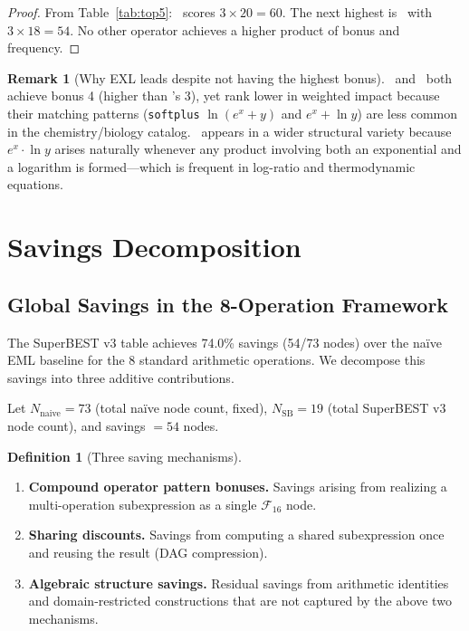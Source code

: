 \documentclass[12pt,a4paper]{article}
\theoremstyle{definition}
\newtheorem{definition}[theorem]{Definition}
\newtheorem{remark}[theorem]{Remark}
\newcommand{\EML}{\operatorname{EML}}
\newcommand{\EXL}{\operatorname{EXL}}
\newcommand{\EAL}{\operatorname{EAL}}
\newcommand{\LEAd}{\operatorname{LEAd}}
\begin{document}
\begin{proof}
From Table~\ref{tab:top5}: \EXL\ scores $3 \times 20 = 60$.
The next highest is \EML\ with $3 \times 18 = 54$.
No other operator achieves a higher product of bonus and frequency.
\end{proof}

\begin{remark}[Why EXL leads despite not having the highest bonus]
\label{rem:exl}
\LEAd\ and \EAL\ both achieve bonus 4 (higher than \EXL's 3), yet rank
lower in weighted impact because their matching patterns (\texttt{softplus}
$\ln(e^x+y)$ and $e^x+\ln y$) are less common in the chemistry/biology
catalog.  \EXL\ appears in a wider structural variety because $e^x \cdot \ln
y$ arises naturally whenever any product involving both an exponential and a
logarithm is formed---which is frequent in log-ratio and thermodynamic
equations.
\end{remark}

\section{Savings Decomposition}
\label{sec:decomposition}

\subsection{Global Savings in the 8-Operation Framework}

The SuperBEST v3 table achieves 74.0\% savings (54/73 nodes) over the
na\"{i}ve EML baseline for the 8 standard arithmetic operations.
We decompose this savings into three additive contributions.

Let $N_{\mathrm{naive}} = 73$ (total na\"{i}ve node count, fixed),
$N_{\mathrm{SB}} = 19$ (total SuperBEST v3 node count), and
savings $= 54$ nodes.

\begin{definition}[Three saving mechanisms]
\label{def:mechanisms}
\begin{enumerate}
  \item \textbf{Compound operator pattern bonuses.}
        Savings arising from realizing a multi-operation subexpression
        as a single $\mathcal{F}_{16}$ node.

  \item \textbf{Sharing discounts.}
        Savings from computing a shared subexpression once and reusing the
        result (DAG compression).

  \item \textbf{Algebraic structure savings.}
        Residual savings from arithmetic identities and domain-restricted
        constructions that are not captured by the above two mechanisms.
\end{enumerate}
\end{definition}
\end{document}
